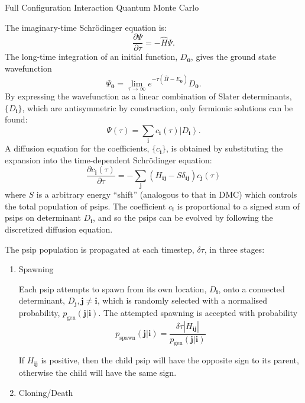 \documentclass[final]{beamer} %
\newcommand{\ket}[1]{\left\vert#1\right\rangle}
\newcommand{\pdd}[2]{\frac{\partial#1}{\partial#2}}
\newcommand{\abs}[1]{\left\vert#1\right\vert}
\newcommand{\Hamil}{\hat{H}}
\newcommand{\Dz}{D_\mathbf{0}}
\newcommand{\dt}{\delta\tau}
\newcommand{\pgen}{p_{\textrm{gen}}}
\newcommand{\bz}{\mathbf{0}}
\newcommand{\bi}{\mathbf{i}}
\newcommand{\bj}{\mathbf{j}}
\begin{document}
\begin{frame}[t]
\begin{columns}[t]
\begin{column}{0.9\paperwidth}
\begin{block}{Full Configuration Interaction Quantum Monte Carlo}
\begin{multicols}{3}
           The imaginary-time Schr\"odinger equation is:
           \begin{equation}
               \pdd{\Psi}{\tau} = - \Hamil \Psi.
           \end{equation}
           The long-time integration of an initial function, $\Dz$, gives the ground state wavefunction
           \begin{equation}
               \Psi_\bz = \lim_{\tau\rightarrow\infty} e^{-\tau(\Hamil -E_\bz)} \Dz.
           \end{equation}
           By expressing the wavefunction as a linear combination of Slater determinants, $\{D_\bi\}$, which are antisymmetric by construction, only fermionic solutions can be found:
           \begin{equation}
               \Psi(\tau) = \sum_\bi c_\bi(\tau) \ket{D_\bi}.
           \end{equation}
           A diffusion equation for the coefficients, $\{c_\bi\}$, is obtained by substituting the expansion into the time-dependent Schr\"odinger equation:
           \begin{equation}
               \pdd{c_\bi(\tau)}{\tau} = -\sum_\bj (H_{\bi\bj} -S\delta_{\bi\bj}) c_\bj(\tau)
           \end{equation}
           where $S$ is a arbitrary energy ``shift'' (analogous to that in DMC) which controls the total population of psips.  The coefficient $c_\bi$ is proportional to a signed sum of psips on determinant $D_\bi$, and so the psips can be evolved by following the discretized diffusion equation.

           The psip population is propagated at each timestep, $\dt$, in three stages:
           \begin{enumerate}
           \item Spawning

           Each psip attempts to spawn from its own location, $D_\bi$, onto a connected determinant, $D_\bj, \bj\ne\bi$, which is randomly selected with a normalised probability, $\pgen(\bj|\bi)$.  The attempted spawning is accepted with probability
           \begin{equation}
               p_{\textrm{spawn}}(\bj|\bi) = \frac{\dt\abs{H_{\bi\bj}}}{\pgen(\bj|\bi)}
           \end{equation}

           If $H_{\bi\bj}$ is positive, then the child psip will have the opposite sign to its parent, otherwise the child will have the same sign.
           \item Cloning/Death


\end{enumerate}
\end{multicols}
\end{block}
\end{column}
\end{columns}
\end{frame}
\end{document}
